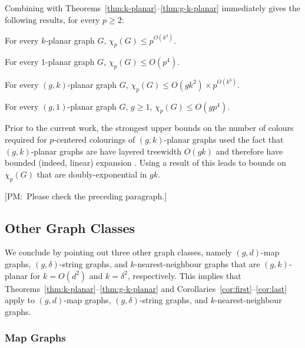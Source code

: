 \documentclass{patmorin}
\newcommand{\note}[2]{{\color{red}[#1:~#2]}}
\begin{document}
Combining  with Theorems~\ref{thm:k-planar}--\ref{thm:g-k-planar} immediately gives the following results, for every $p\ge 2$:

\begin{cor}
  For every $k$-planar graph $G$, $\chi_p(G)\le p^{O(k^3)}$.
\end{cor}

\begin{cor}
  For every $1$-planar graph $G$, $\chi_p(G)\le O(p^4)$. 
\end{cor}

\begin{cor}
  For every $(g,k)$-planar graph $G$, $\chi_p(G)\le O(gk^2)\times p^{O(k^3)}$. 
\end{cor}

\begin{cor}
  For every $(g,1)$-planar graph $G$, $g\ge 1$, $\chi_p(G)\le O(gp^4)$.
\end{cor}

Prior to the current work, the strongest upper bounds on the number of colours required for $p$-centered colourings of $(g,k)$-planar graphs used the fact that $(g,k)$-planar graphs are have layered treewidth $O(gk)$ \cite{dujmovic.eppstein.ea:structure} and therefore have bounded (indeed, linear) expansion \cite{dujmovic.morin.ea:layered}.  Using a result of \citet{zhu:colouring} this leads to bounds on $\chi_p(G)$ that are doubly-exponential in $gk$.

\note{PM}{Please check the preceding paragraph.}


\subsection{Other Graph Classes}

We conclude by pointing out three other graph classes, namely $(g,d)$-map graphs, $(g,\delta)$-string graphs, and $k$-nearest-neighbour graphs that are $(g,k)$-planar for $k=O(d^2)$ and $k=\delta^2$, respectively.  This implies that Theorems~\ref{thm:k-planar}--\ref{thm:g-k-planar} and Corollaries~\ref{cor:first}--\ref{cor:last} apply to $(g,d)$-map graphs, $(g,\delta)$-string graphs, and $k$-nearest-neighbour graphs.


\subsubsection{Map Graphs}
\end{document}

